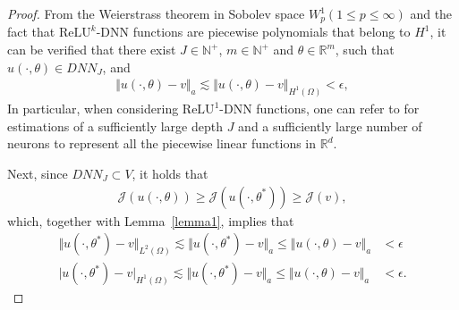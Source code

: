 \documentclass[a4paper, 11pt]{article}
\numberwithin{equation}{section}
\begin{document}
\begin{proof}
From the Weierstrass theorem in Sobolev space {\color{blue}$W^1_p(1\leq p \leq \infty)$} and the fact that $\text{ReLU}^k$-DNN functions are piecewise polynomials that belong to $H^1$, it can be verified that there exist $J\in \mathbb{N}^{+}$, $m\in \mathbb{N}^{+}$ and $\theta\in \mathbb{R}^m$, such that $u(\cdot,\theta)\in DNN_{J}$, and
\begin{align}
\Vert u(\cdot,\theta) - v \Vert_a \lesssim \Vert u(\cdot,\theta)  - v \Vert_{H^1(\Omega)} < \epsilon,
\end{align}
In particular, when considering $\text{ReLU}^1$-DNN functions, one can refer to \cite{XuJCM2018} for estimations of a sufficiently large depth $J$ and a sufficiently large number of neurons to represent all the piecewise linear functions in $\mathbb{R}^d$.

\quad\quad Next, since $DNN_{J} \subset V$, it holds that
\begin{align}
\mathcal{J}(u(\cdot,\theta)) \geq \mathcal{J}(u(\cdot,\theta^*)) \geq \mathcal{J}(v),
\end{align}
which, together with Lemma~\ref{lemma1}, implies that 
\begin{align}
\Vert u(\cdot,\theta^*) - v \Vert_{L^2(\Omega)} \lesssim \Vert u(\cdot,\theta^*) -v \Vert_a \leq \Vert u(\cdot,\theta) -v \Vert_a &< \epsilon \\
\big | u(\cdot,\theta^*) - v  \big |_{H^1(\Omega)} \lesssim \Vert u(\cdot,\theta^*) -v \Vert_a \leq \Vert u(\cdot,\theta) -v \Vert_a &< \epsilon.
\end{align}
\end{proof} 
\end{document}
